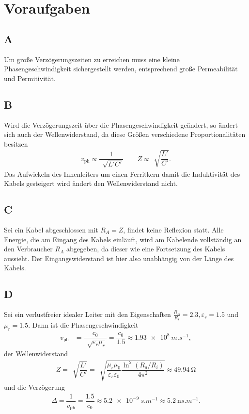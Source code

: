 \documentclass[a4paper,12pt,twocoloumn]{article}
\numberwithin{equation}{section}
\begin{document}
\newpage
\section{Voraufgaben}
\subsection{A}
Um große Verzögerungszeiten zu erreichen muss eine kleine Phasengeschwindigkeit sichergestellt werden, entsprechend große Permeabilität und Permitivität.

\subsection{B}
Wird die Verzögerungszeit über die Phasengeschwindigkeit geändert, so ändert sich auch der Wellenwiderstand, da diese Größen verschiedene Proportionalitäten besitzen
\begin{align} 
        v_{\text{ph}}\propto \dfrac{1}{\,\sqrt[]{L'C'}}\qquad Z\propto \,\sqrt[]{\dfrac{L'}{C'}}
.\end{align} 
Das Aufwickeln des Innenleiters um einen Ferritkern damit die Induktivität des Kabels gesteigert wird ändert den Wellenwiderstand nicht.

\subsection{C}
Sei ein Kabel abgeschlossen mit $R_A=Z$, findet keine Reflexion statt.
Alle Energie, die am Eingang des Kabels einläuft, wird am Kabelende vollständig an den Verbraucher $R_A$ abgegeben, da dieser wie eine Fortsetzung des Kabels aussieht.
Der Eingangswiderstand ist hier also unabhängig von der Länge des Kabels.

\subsection{D}
Sei ein verlustfreier idealer Leiter mit den Eigenschaften $\tfrac{R_A}{R_I}=2.3,\varepsilon _r=1.5$ und $\mu _r=1.5$.
Dann ist die Phasengeschwindigkeit
\begin{align} 
        v_{\text{ph}}&=\dfrac{c_0}{\,\sqrt[]{\varepsilon _r\mu _r}}=\dfrac{c_0}{1.5}\approx \SI{1.93e+8}{m.s ^{-1}}
,\end{align} 
der Wellenwiderstand
\begin{align} 
        Z=\,\sqrt[]{\dfrac{L'}{C'}}=\,\sqrt[]{\dfrac{\mu _r\mu _0}{\varepsilon _r\varepsilon _0}\dfrac{\ln^2\left(R_a/R_i\right)}{4\pi ^2}}\approx \SI{49.94}{\ohm}
\end{align} 
und die Verzögerung
\begin{align} 
        \Delta =\dfrac{1}{v_{\text{ph} }}=\dfrac{1.5}{c_0}\approx \SI{5.2e-9}{s.m ^{-1}}\approx \SI{5.2}{\nano s.m ^{-1}}
.\end{align} 
\end{document}
